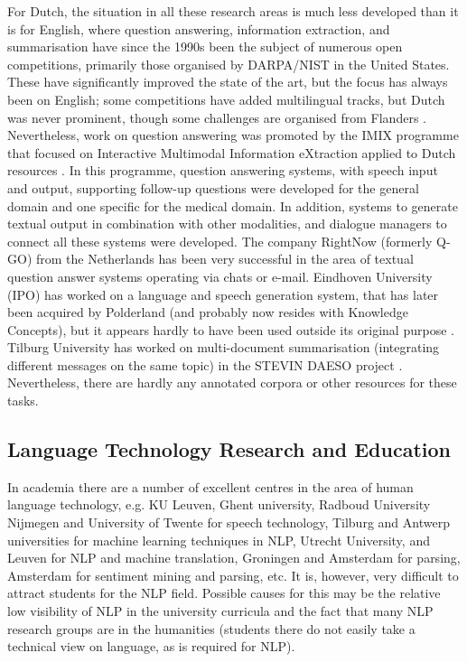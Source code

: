 \documentclass[]{../../metanetpaper}
\begin{document}
\begin{multicols}{2}

For Dutch, the situation in all these research areas is much less developed than it is for English, where question answering, information extraction, and summarisation have since the 1990s been the subject of numerous open competitions, primarily those organised by DARPA/NIST in the United States. These have significantly improved the state of the art, but the focus has always been on English; some competitions have added multilingual tracks, but Dutch was never prominent, though some challenges are organised from Flanders \cite{SemEval}.  Nevertheless, work on question answering was promoted by the IMIX programme that focused on Interactive Multimodal Information eXtraction applied to Dutch resources \cite{IMIX}.  In this programme, question answering systems, with speech input and output, supporting follow-up questions were developed for the general domain and one specific for the medical domain. In addition, systems to generate textual output in combination with other modalities, and dialogue managers to connect all these systems were developed. The company RightNow (formerly Q-GO) from the Netherlands has been very successful in the area of textual question answer systems operating via chats or e-mail.  Eindhoven University (IPO) has worked on a language and speech generation system, that has later been acquired by Polderland (and probably now resides with Knowledge Concepts), but it appears hardly to have been used outside its original purpose \cite{Theune:2003}.  Tilburg University has worked on multi-document summarisation (integrating different messages on the same topic) in the STEVIN DAESO project \cite{DAESO}.  Nevertheless, there are hardly any annotated corpora or other resources for these tasks.

\subsection{Language Technology Research and Education}

    In academia there are a number of excellent centres in the area of human language technology, e.g.  KU Leuven, Ghent university, Radboud University Nijmegen and University of Twente for speech technology, Tilburg and Antwerp universities for machine learning techniques in NLP, Utrecht University, and Leuven for NLP and machine translation, Groningen and Amsterdam for parsing, Amsterdam for sentiment mining and parsing, etc. It is, however, very difficult to attract students for the NLP field. Possible causes for this may be the relative low visibility of NLP in the university curricula and the fact that many NLP research groups are in the humanities (students there do not easily take a technical view on language, as is required for NLP).


\end{multicols}
\end{document}
